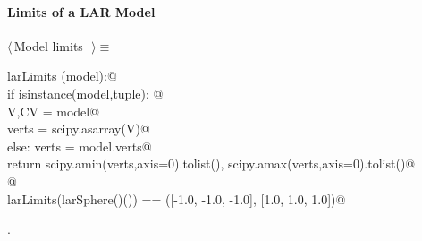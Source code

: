 \documentclass[11pt,oneside]{article}	%
\begin{document}
\paragraph{Limits of a LAR Model}
\begin{flushleft} \small \label{scrap48}
$\langle\,$Model limits\nobreak\ {\footnotesize {}}$\,\rangle\equiv$
\vspace{-1ex}
\begin{list}{}{} \item
\mbox{}\verb@def larLimits (model):@\\
\mbox{}\verb@   if isinstance(model,tuple): @\\
\mbox{}\verb@      V,CV = model@\\
\mbox{}\verb@      verts = scipy.asarray(V)@\\
\mbox{}\verb@   else: verts = model.verts@\\
\mbox{}\verb@   return scipy.amin(verts,axis=0).tolist(), scipy.amax(verts,axis=0).tolist()@\\
\mbox{}\verb@   @\\
\mbox{}\verb@assert larLimits(larSphere()()) == ([-1.0, -1.0, -1.0], [1.0, 1.0, 1.0])@\\
\mbox{}\verb@@{\NWsep}
\end{list}
\vspace{-1ex}
\footnotesize\addtolength{\baselineskip}{-1ex}
\begin{list}{}{\setlength{\itemsep}{-\parsep}\setlength{\itemindent}{-\leftmargin}}
\item {\NWtxtMacroNoRef}.
\end{list}
\end{flushleft}
\end{document}
